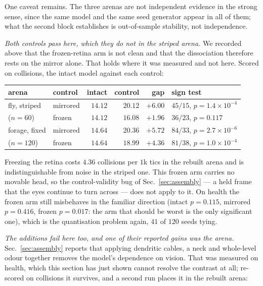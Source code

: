 \documentclass[10pt,twoside]{article}
\begin{document}
One caveat remains. The three arenas are not independent evidence in the strong
sense, since the same model and the same seed generator appear in all of them;
what the second block establishes is out-of-sample stability, not independence.

\emph{Both controls pass here, which they do not in the striped arena.} We
recorded above that the frozen-retina arm is not clean and that the dissociation
therefore rests on the mirror alone. That holds where it was measured and not
here. Scored on collisions, the intact model against each control:

\begin{center}
\small
\begin{tabular}{llrrrl}
\toprule
arena & control & intact & control & gap & sign test\\
\midrule
fly, striped & mirrored & $14.12$ & $20.12$ & $+6.00$ & $45/15$, $p=1.4\times10^{-4}$\\
($n=60$)     & frozen   & $14.12$ & $16.08$ & $+1.96$ & $36/23$, $p=0.117$\\
forage, fixed & mirrored & $14.64$ & $20.36$ & $+5.72$ & $84/33$, $p=2.7\times10^{-6}$\\
($n=120$)     & frozen   & $14.64$ & $18.99$ & $+4.36$ & $81/38$, $p=1.0\times10^{-4}$\\
\bottomrule
\end{tabular}
\end{center}

Freezing the retina costs $4.36$ collisions per $1$k tics in the rebuilt arena
and is indistinguishable from noise in the striped one. This frozen arm carries
no movable head, so the control-validity bug of Sec.~\ref{sec:assembly} --- a
held frame that the eyes continue to turn across --- does not apply to it. On
health the frozen arm still misbehaves in the familiar direction (intact
$p=0.115$, mirrored $p=0.416$, frozen $p=0.017$: the arm that should be worst is
the only significant one), which is the quantisation problem again, $41$ of $120$
seeds tying.

\emph{The additions fail here too, and one of their reported gains was the
arena.} Sec.~\ref{sec:assembly} reports that applying dendritic cables, a neck
and whole-level odour together removes the model's dependence on vision. That
was measured on health, which this section has just shown cannot resolve the
contrast at all; re-scored on collisions it survives, and a second run places it
in the rebuilt arena:
\end{document}
